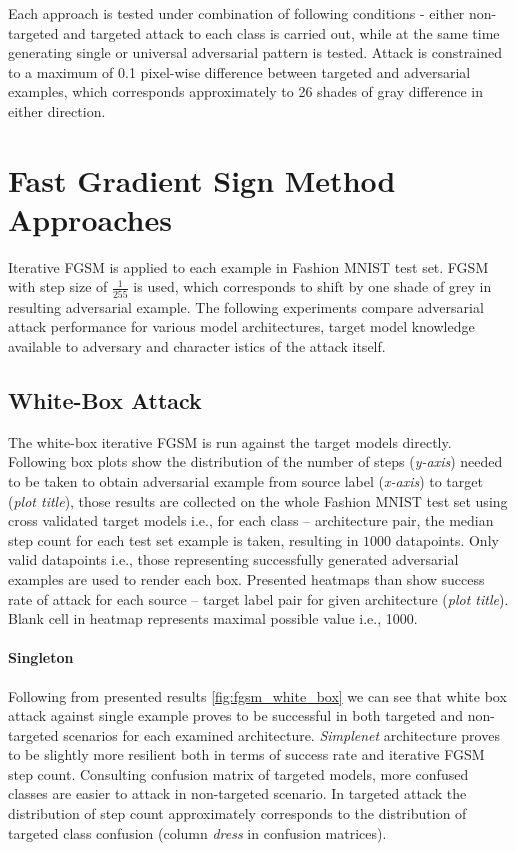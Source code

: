 Each approach is tested under combination of following conditions - either non-targeted and targeted attack to each class is carried out, while at the same time generating single or universal adversarial pattern is tested. Attack is constrained  to a maximum of 0.1 pixel-wise difference between targeted and adversarial examples, which corresponds approximately to 26 shades of gray difference in either direction.

\section{Fast Gradient Sign Method Approaches}
Iterative FGSM is applied to each example in Fashion MNIST test set. FGSM with step size of $\frac{1}{255}$ is used, which corresponds to shift by one shade of grey in resulting adversarial example. The following experiments compare adversarial attack performance for various model architectures, target model knowledge available to adversary and character istics of the attack itself.

\subsection{White-Box Attack}
The white-box iterative FGSM is run against the target models directly. Following box plots show the distribution of the number of steps (\textit{y-axis}) needed to be taken to obtain adversarial example from source label (\textit{x-axis}) to target (\textit{plot title}), those results are collected on the whole Fashion MNIST test set using cross validated target models i.e., for each class -- architecture pair, the median step count for each test set example is taken, resulting in $1000$ datapoints. Only valid datapoints i.e., those representing successfully generated adversarial examples are used to render each box. Presented heatmaps than show success rate of attack for each source -- target label pair for given architecture (\textit{plot title}). Blank cell in heatmap represents maximal possible value i.e., 1000.

\paragraph{Singleton}

Following from presented results \ref{fig:fgsm_white_box} we can see that white box attack against single example proves to be successful in both targeted and non-targeted scenarios for each examined architecture. \textit{Simplenet} architecture proves to be slightly more resilient both in terms of success rate and iterative FGSM step count. Consulting confusion matrix of targeted models, more confused classes are easier to attack in non-targeted scenario. In targeted attack the distribution of step count approximately corresponds to the distribution of targeted class confusion (column \textit{dress} in confusion matrices).

